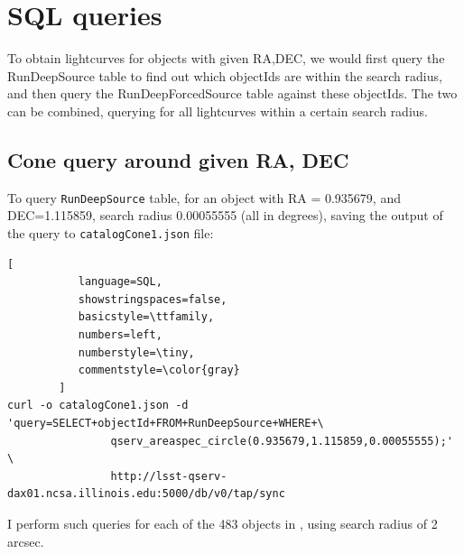 \documentclass[fleqn,usenatbib]{mnras} %
\begin{document}







\onecolumn
\appendix

\section{SQL queries}
To obtain lightcurves for objects with given RA,DEC,  we would first query the RunDeepSource table to find out which objectIds are within the search radius, and then query the RunDeepForcedSource table against these objectIds.  The two can be combined, querying for all lightcurves within a certain search radius. 

\subsection{Cone query around given RA, DEC}

To query \verb|RunDeepSource| table, for an object with RA = 0.935679, and DEC=1.115859, search radius 0.00055555 (all in degrees), saving the output of the query to \verb|catalogCone1.json| file:

\begin{lstlisting}[
           language=SQL,
           showstringspaces=false,
           basicstyle=\ttfamily,
           numbers=left,
           numberstyle=\tiny,
           commentstyle=\color{gray}
        ]
curl -o catalogCone1.json -d 'query=SELECT+objectId+FROM+RunDeepSource+WHERE+\
                qserv_areaspec_circle(0.935679,1.115859,0.00055555);' \
                http://lsst-qserv-dax01.ncsa.illinois.edu:5000/db/v0/tap/sync
\end{lstlisting}

I perform such queries for each of the 483 objects in \cite{sesar2010}, using search radius of 2 arcsec. 
\end{document}
